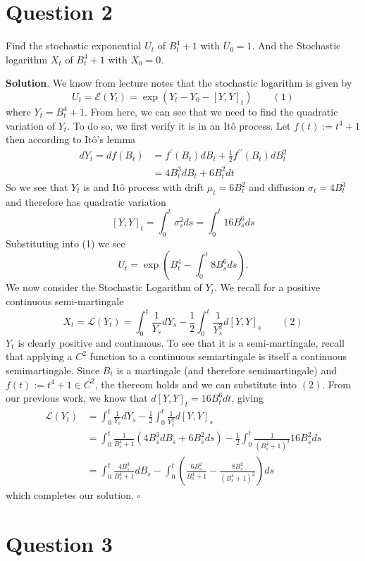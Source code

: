 \documentclass{article}
\begin{document}
\section{Question 2}
\begin{tcolorbox}
[colframe=black,colback=gray!5,boxrule=0.5pt]
 Find the stochastic exponential $U_t$ of $B_t^4+1$ with $U_0=1$. And the Stochastic logarithm $X_t$ of $B_t^4+1$ with $X_0=0$.
\end{tcolorbox}
\textbf{Solution}. We know from lecture notes that the stochastic logarithm is given by
$$U_t = \mathcal{E}(Y_t) = \exp\left(Y_t - Y_0 - [Y,Y]_t\right)\quad\quad (1)$$
where $Y_t= B_t^4+1$. From here, we can see that we need to find the quadratic variation of $Y_t$. To do so, we first verify it is in an Itô process. Let $f(t):=t^4+1$ then according to Itô's lemma
\begin{align*}
    dY_t = df(B_t) &= f^\prime(B_t)dB_t + \frac{1}{2}f^{\prime\prime}(B_t)dB_t^2 \\
            &= 4B_t^3dB_t + 6B_t^2dt
\end{align*}
So we see that $Y_t$ is and Itô process with drift $\mu_t = 6B_t^2$ and diffusion $\sigma_t=4B_t^3$ and therefore has quadratic variation 
$$[Y,Y]_t = \int_0^t\sigma_s^2ds = \int_0^t16B_s^6 ds$$
Substituting into (1) we see
$$U_t  = \exp\left(B_t^4 - \int_0^t8B_s^6ds\right).$$
We now consider the Stochastic Logarithm of $Y_t$. We recall for a positive continuous semi-martingale 
$$X_t = \mathcal{L}(Y_t) = \int_0^t\frac{1}{Y_s}dY_s - \frac{1}{2}\int_0^t\frac{1}{Y_s^2}d[Y,Y]_s \quad\quad(2)$$
$Y_t$ is clearly positive and continuous. To see that it is a semi-martingale, recall that applying a $C^2$ function to a continuous semiartingale is itself a continuous semimartingale. Since $B_t$ is a martingale (and therefore semimartingale) and $f(t) := t^4+1 \in C^2$, the thereom holds and we can substitute into  $(2)$.
From our previous work, we know that $d[Y,Y]_t = 16B_t^6dt$, giving
\begin{align*}
    \mathcal{L}(Y_t) &= \int_0^t\frac{1}{Y_s}dY_s - \frac{1}{2}\int_0^t\frac{1}{Y_s^2}d[Y,Y]_s \\
    &= \int_0^t\frac{1}{B_s^4+1}(4B_s^3dB_s + 6B_s^2ds)-\frac{1}{2}\int_0^t \frac{1}{(B_s^4+1)^2}16B_s^2ds \\
    &= \int_0^t\frac{4B_s^3}{B_s^4+1}dB_s-\int_0^t\left( \frac{6B_s^2}{B_s^4+1}-\frac{8B_s^2}{(B_s^4+1)^2}\right)ds
\end{align*}
which completes our solution. $\square$

\newpage
\section{Question 3}
\end{document}
